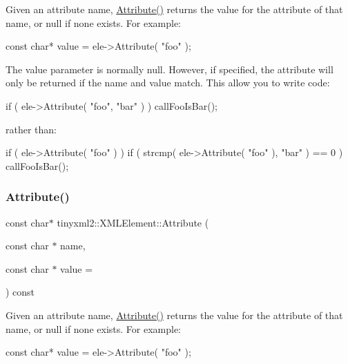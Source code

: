 Given an attribute name, \hyperlink{classtinyxml2_1_1XMLElement_a48cf4a315cfbac7d74cd0d5ff2c5df51}{Attribute()} returns the value for the attribute of that name, or null if none exists. For example\+:

\begin{DoxyVerb}const char* value = ele->Attribute( "foo" );
\end{DoxyVerb}


The \textquotesingle{}value\textquotesingle{} parameter is normally null. However, if specified, the attribute will only be returned if the \textquotesingle{}name\textquotesingle{} and \textquotesingle{}value\textquotesingle{} match. This allow you to write code\+:

\begin{DoxyVerb}if ( ele->Attribute( "foo", "bar" ) ) callFooIsBar();
\end{DoxyVerb}


rather than\+: \begin{DoxyVerb}if ( ele->Attribute( "foo" ) ) {
    if ( strcmp( ele->Attribute( "foo" ), "bar" ) == 0 ) callFooIsBar();
}
\end{DoxyVerb}
 \mbox{\label{classtinyxml2_1_1XMLElement_a70e49ed60b11212ae35f7e354cfe1de9}} 
\subsubsection{\texorpdfstring{Attribute()}{Attribute()}\hspace{0.1cm}{\footnotesize\ttfamily [2/2]}}
{\footnotesize\ttfamily const char$\ast$ tinyxml2\+::\+X\+M\+L\+Element\+::\+Attribute (\begin{DoxyParamCaption}\item[{const char $\ast$}]{name,  }\item[{const char $\ast$}]{value = {} }\end{DoxyParamCaption}) const}

Given an attribute name, \hyperlink{classtinyxml2_1_1XMLElement_a48cf4a315cfbac7d74cd0d5ff2c5df51}{Attribute()} returns the value for the attribute of that name, or null if none exists. For example\+:

\begin{DoxyVerb}const char* value = ele->Attribute( "foo" );
\end{DoxyVerb}


